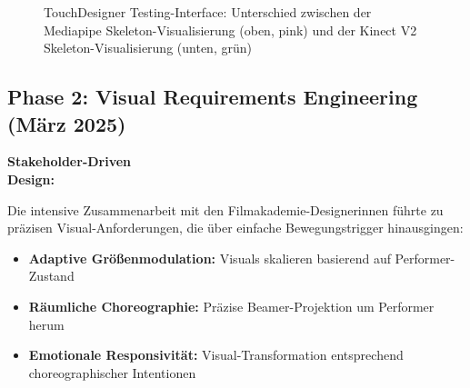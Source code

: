 \begin{figure}[htbp]
    \centering
    \caption{TouchDesigner Testing-Interface: Unterschied zwischen der Mediapipe Skeleton-Visualisierung (oben, pink) und der Kinect V2 Skeleton-Visualisierung (unten, grün)}
    \label{fig:testing_interface}
\end{figure}

\subsection{Phase 2: Visual Requirements Engineering (März 2025)}

\textbf{Stakeholder-Driven\\Design:}
\raggedright Die intensive Zusammenarbeit mit den Filmakademie-Designerinnen führte zu präzisen Visual-Anforderungen, die über einfache Bewegungstrigger hinausgingen:

\begin{itemize}
    \item \textbf{Adaptive Größenmodulation:} Visuals skalieren basierend auf Performer-Zustand
    \item \textbf{Räumliche Choreographie:} Präzise Beamer-Projektion um Performer herum
    \item \textbf{Emotionale Responsivität:} Visual-Transformation entsprechend choreographischer Intentionen
\end{itemize}

